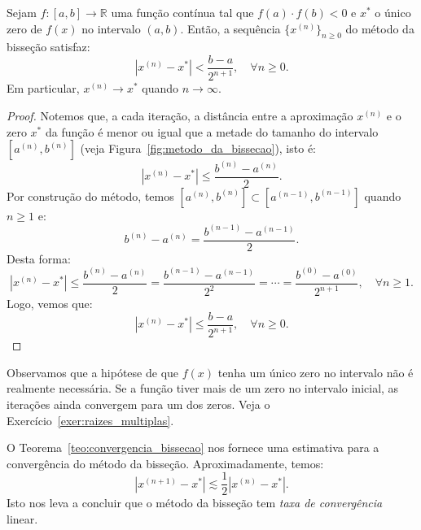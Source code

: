 \begin{teo}\label{teo:convergencia_bissecao} Sejam $f:[a, b]\to \mathbb{R}$ uma função contínua tal que $f(a)\cdot f(b) < 0$ e $x^*$ o único zero de $f(x)$ no intervalo $(a, b)$. Então, a sequência $\{x^{(n)}\}_{n \geq 0}$ do método da bisseção satisfaz:
  \begin{equation}
    |x^{(n)} - x^{*}| < \frac{b - a}{2^{n+1}},\quad\forall n\geq 0.
  \end{equation}
Em particular, $x^{(n)}\to x^*$ quando $n\to\infty$.
\end{teo}
\begin{proof}
 Notemos que, a cada iteração, a distância entre a aproximação $x^{(n)}$ e o zero $x^*$ da função é menor ou igual que a metade do tamanho do intervalo $[a^{(n)}, b^{(n)}]$ (veja Figura~\ref{fig:metodo_da_bissecao}), isto é:
\begin{equation}
  |x^{(n)}-x^*| \leq \frac{b^{(n)}-a^{(n)}}{2}.
\end{equation}
Por construção do método, temos $[a^{(n)}, b^{(n)}]\subset [a^{(n-1)}, b^{(n-1)}]$ quando $n \geq 1$ e:
\begin{equation}
  b^{(n)} - a^{(n)} = \frac{b^{(n-1)}-a^{(n-1)}}{2}.
\end{equation}
Desta forma:
\begin{equation}
  |x^{(n)}-x^*|  \leq \frac{b^{(n)}-a^{(n)}}{2} = \frac{b^{(n-1)}-a^{(n-1)}}{2^2} = \cdots = \frac{b^{(0)}-a^{(0)}}{2^{n+1}},\quad \forall n\geq 1.
\end{equation}
Logo, vemos que:
\begin{equation}
  |x^{(n)}-x^*|  \leq \frac{b-a}{2^{n+1}},\quad \forall n\geq 0.
\end{equation}
\end{proof}

Observamos que a hipótese de que $f(x)$ tenha um único zero no intervalo não é realmente necessária. Se a função tiver mais de um zero no intervalo inicial, as iterações ainda convergem para um dos zeros. Veja o Exercício~\ref{exer:raizes_multiplas}.

\begin{obs}
  O Teorema~\ref{teo:convergencia_bissecao} nos fornece uma estimativa para a convergência do método da bisseção. Aproximadamente, temos:
  \begin{equation}
    |x^{(n+1)} - x^*| \lesssim \frac{1}{2}|x^{(n)} - x^*|.
  \end{equation}
Isto nos leva a concluir que o método da bisseção tem \emph{taxa de convergência} linear.
\end{obs}

